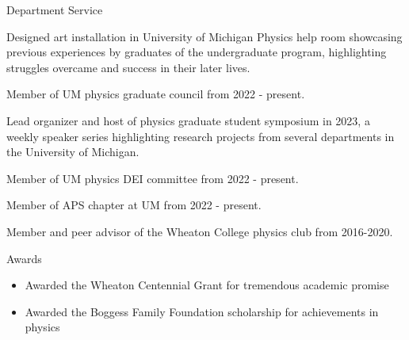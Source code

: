 \documentclass{resume} %
\begin{document}

\begin{rSection}{Department Service}
    \begin{itemize}
        \item Designed art installation in University of Michigan Physics help room showcasing previous experiences by graduates of the undergraduate program, highlighting struggles overcame and success in their later lives.
        \item{Member of UM physics graduate council from 2022 - present. 
        \item Lead organizer and host of physics graduate student symposium in 2023, a weekly speaker series highlighting research projects from several departments in the University of Michigan.}
    \item{Member of UM physics DEI committee from 2022 - present.}
    \item Member of APS chapter at UM from 2022 - present.
    \item Member and peer advisor of the Wheaton College physics club from 2016-2020.
    \end{itemize}
    \end{rSection}
    
    \begin{rSection}{Awards}
        \begin{itemize}
            \item Awarded the Wheaton Centennial Grant for tremendous academic promise
            \item Awarded the Boggess Family Foundation scholarship for achievements in physics
        \end{itemize}
                
        \end{rSection}

\end{document}
